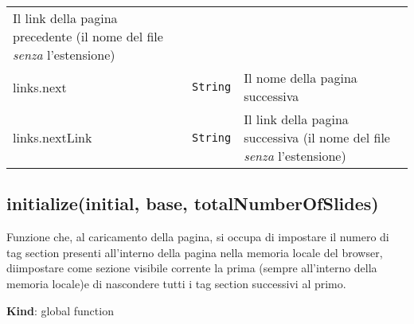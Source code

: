 \begin{tabularx}{\textwidth}{XXX}
\begin{minipage}[t]{0.30\columnwidth}
Il link della pagina precedente (il nome del file \emph{senza}
l'estensione)\strut
\end{minipage}\tabularnewline
\begin{minipage}[t]{0.30\columnwidth}\raggedright
links.next\strut
\end{minipage} & \begin{minipage}[t]{0.30\columnwidth}\raggedright
\texttt{String}\strut
\end{minipage} & \begin{minipage}[t]{0.30\columnwidth}\raggedright
Il nome della pagina successiva\strut
\end{minipage}\tabularnewline
\begin{minipage}[t]{0.30\columnwidth}\raggedright
links.nextLink\strut
\end{minipage} & \begin{minipage}[t]{0.30\columnwidth}\raggedright
\texttt{String}\strut
\end{minipage} & \begin{minipage}[t]{0.30\columnwidth}\raggedright
Il link della pagina successiva (il nome del file \emph{senza}
l'estensione)\strut
\end{minipage}\tabularnewline
\bottomrule
\end{tabularx}

\protect\hypertarget{initialize}{}{}

\hypertarget{initializeinitial-base-totalnumberofslides}{%
\subsection{initialize(initial, base,
totalNumberOfSlides)}\label{initializeinitial-base-totalnumberofslides}}

Funzione che, al caricamento della pagina, si occupa di impostare il
numero di tag section presenti all'interno della pagina nella memoria
locale del browser, diimpostare come sezione visibile corrente la prima
(sempre all'interno della memoria locale)e di nascondere tutti i tag
section successivi al primo.

\textbf{Kind}: global function


